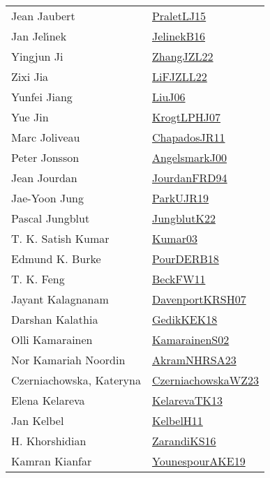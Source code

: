 {\begin{longtable}{p{4cm}p{20cm}}
Jean Jaubert & \href{papers/PraletLJ15.pdf}{PraletLJ15}\cite{PraletLJ15} \\
Jan Jel{\'{\i}}nek & \href{papers/JelinekB16.pdf}{JelinekB16}\cite{JelinekB16} \\
Yingjun Ji & \href{papers/ZhangJZL22.pdf}{ZhangJZL22}\cite{ZhangJZL22} \\
Zixi Jia & \href{papers/LiFJZLL22.pdf}{LiFJZLL22}\cite{LiFJZLL22} \\
Yunfei Jiang & \href{papers/LiuJ06.pdf}{LiuJ06}\cite{LiuJ06} \\
Yue Jin & \href{papers/KrogtLPHJ07.pdf}{KrogtLPHJ07}\cite{KrogtLPHJ07} \\
Marc Joliveau & \href{papers/ChapadosJR11.pdf}{ChapadosJR11}\cite{ChapadosJR11} \\
Peter Jonsson & \href{papers/AngelsmarkJ00.pdf}{AngelsmarkJ00}\cite{AngelsmarkJ00} \\
Jean Jourdan & \href{}{JourdanFRD94}\cite{JourdanFRD94} \\
Jae{-}Yoon Jung & \href{papers/ParkUJR19.pdf}{ParkUJR19}\cite{ParkUJR19} \\
Pascal Jungblut & \href{}{JungblutK22}\cite{JungblutK22} \\
T. K. Satish Kumar & \href{papers/Kumar03.pdf}{Kumar03}\cite{Kumar03} \\
Edmund K. Burke & \href{articles/PourDERB18.pdf}{PourDERB18}\cite{PourDERB18} \\
T. K. Feng & \href{}{BeckFW11}\cite{BeckFW11} \\
Jayant Kalagnanam & \href{papers/DavenportKRSH07.pdf}{DavenportKRSH07}\cite{DavenportKRSH07} \\
Darshan Kalathia & \href{articles/GedikKEK18.pdf}{GedikKEK18}\cite{GedikKEK18} \\
Olli Kamarainen & \href{papers/KamarainenS02.pdf}{KamarainenS02}\cite{KamarainenS02} \\
Nor Kamariah Noordin & \href{articles/AkramNHRSA23.pdf}{AkramNHRSA23}\cite{AkramNHRSA23} \\
Czerniachowska, Kateryna & \href{articles/CzerniachowskaWZ23.pdf}{CzerniachowskaWZ23}\cite{CzerniachowskaWZ23} \\
Elena Kelareva & \href{papers/KelarevaTK13.pdf}{KelarevaTK13}\cite{KelarevaTK13} \\
Jan Kelbel & \href{articles/KelbelH11.pdf}{KelbelH11}\cite{KelbelH11} \\
H. Khorshidian & \href{articles/ZarandiKS16.pdf}{ZarandiKS16}\cite{ZarandiKS16} \\
Kamran Kianfar & \href{}{YounespourAKE19}\cite{YounespourAKE19} \\

\end{longtable}}
